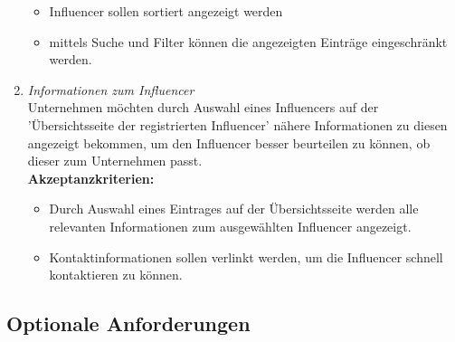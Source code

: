 \documentclass[conference,a4paper,flushend]{cs-techrep}
\begin{document}
\begin{enumerate}
{\begin{itemize}
\item{Influencer sollen sortiert angezeigt werden}

\item{mittels Suche und Filter können die angezeigten Einträge eingeschränkt werden.\\}
\end{itemize}}



\item{\textit{Informationen zum Influencer}\\
Unternehmen möchten durch Auswahl eines Influencers auf der 'Übersichtsseite der registrierten Influencer' nähere Informationen zu diesen angezeigt bekommen, um den Influencer besser beurteilen zu können, ob dieser zum Unternehmen passt.\\
 \textbf{Akzeptanzkriterien:}
 \begin{itemize}
\item{Durch Auswahl eines Eintrages auf der Übersichtsseite werden alle relevanten Informationen zum ausgewählten Influencer angezeigt.}
\item{Kontaktinformationen sollen verlinkt werden, um die Influencer schnell kontaktieren zu können.\\}
\end{itemize}}
\end{enumerate}



\subsection{Optionale Anforderungen} %
\end{document}
